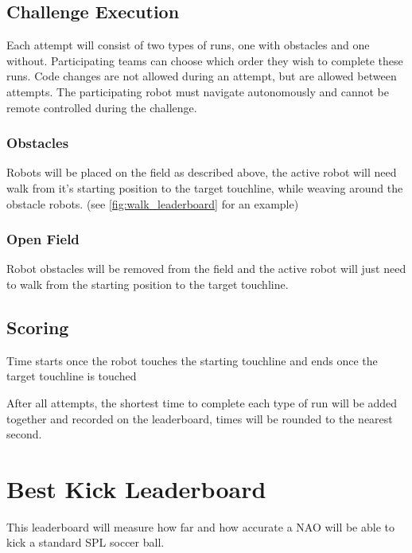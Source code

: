 \subsection{Challenge Execution}
Each attempt will consist of two types of runs, one with obstacles and one without.
Participating teams can choose which order they wish to complete these runs. Code changes are not allowed during an attempt,
but are allowed between attempts. The participating robot must navigate autonomously and cannot be remote controlled during the challenge.

\subsubsection{Obstacles}
Robots will be placed on the field as described above, the active robot will need walk from it's
starting position to the target touchline, while weaving around the obstacle robots. (see \cref{fig:walk_leaderboard} for an example)

\subsubsection{Open Field}
Robot obstacles will be removed from the field and the active robot will just need to walk 
from the starting position to the target touchline.

\subsection{Scoring}
Time starts once the robot touches the starting touchline and ends once the target touchline is touched

After all attempts, the shortest time to complete each type of run will be added together and recorded
on the leaderboard, times will be rounded to the nearest second.

\section{Best Kick Leaderboard}
This leaderboard will measure how far and how accurate a NAO will be able to kick a standard
SPL soccer ball.

